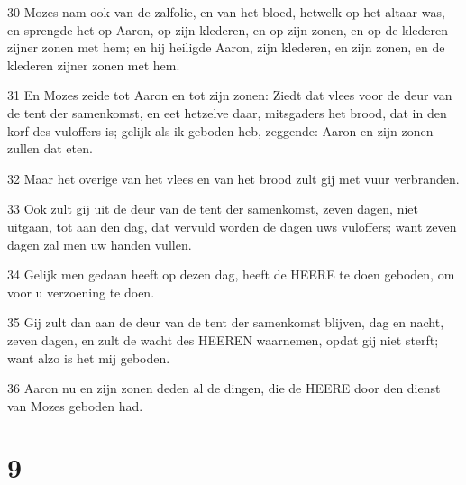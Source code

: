 \par 30 Mozes nam ook van de zalfolie, en van het bloed, hetwelk op het altaar was, en sprengde het op Aaron, op zijn klederen, en op zijn zonen, en op de klederen zijner zonen met hem; en hij heiligde Aaron, zijn klederen, en zijn zonen, en de klederen zijner zonen met hem.
\par 31 En Mozes zeide tot Aaron en tot zijn zonen: Ziedt dat vlees voor de deur van de tent der samenkomst, en eet hetzelve daar, mitsgaders het brood, dat in den korf des vuloffers is; gelijk als ik geboden heb, zeggende: Aaron en zijn zonen zullen dat eten.
\par 32 Maar het overige van het vlees en van het brood zult gij met vuur verbranden.
\par 33 Ook zult gij uit de deur van de tent der samenkomst, zeven dagen, niet uitgaan, tot aan den dag, dat vervuld worden de dagen uws vuloffers; want zeven dagen zal men uw handen vullen.
\par 34 Gelijk men gedaan heeft op dezen dag, heeft de HEERE te doen geboden, om voor u verzoening te doen.
\par 35 Gij zult dan aan de deur van de tent der samenkomst blijven, dag en nacht, zeven dagen, en zult de wacht des HEEREN waarnemen, opdat gij niet sterft; want alzo is het mij geboden.
\par 36 Aaron nu en zijn zonen deden al de dingen, die de HEERE door den dienst van Mozes geboden had.

\chapter{9}

